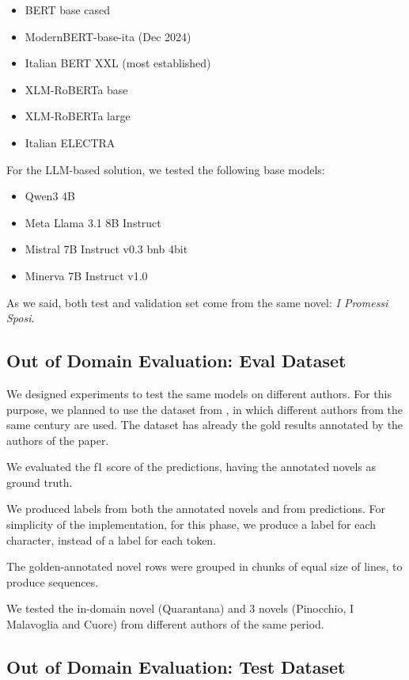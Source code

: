 \documentclass[11pt]{article}
\begin{document}
 \begin{itemize}
 	\item BERT base cased
	\item ModernBERT-base-ita (Dec 2024)
	\item Italian BERT XXL (most established)
	\item XLM-RoBERTa base
	\item XLM-RoBERTa large
	\item Italian ELECTRA
\end{itemize}

For the LLM-based solution, we tested the following base models:

 \begin{itemize}
 	\item Qwen3 4B
	\item Meta Llama 3.1 8B Instruct
	\item Mistral 7B Instruct v0.3 bnb 4bit
	\item Minerva 7B Instruct v1.0
\end{itemize}

As we said, both test and validation set come from the same novel: \emph{I Promessi Sposi}. 

\subsection{Out of Domain Evaluation: Eval Dataset}

We designed experiments to test the same models on different authors.
For this purpose, we planned to use the dataset from \cite{redaelli-sprugnoli-2024-sentence}, in which different authors
from the same century are used.
The dataset has already the gold results annotated by the authors of the paper.

We evaluated the f1 score of the predictions, having the annotated
novels as ground truth.

We produced labels from both the annotated novels and 
from predictions. For simplicity of the implementation,
for this phase, we produce a label for each character, instead of a label for each token.

The golden-annotated novel rows were grouped in chunks of equal size of lines, to produce sequences.

We tested the in-domain novel (Quarantana) and 3 novels (Pinocchio, I Malavoglia and Cuore) from different authors of the same period.

\subsection{Out of Domain Evaluation: Test Dataset}
\end{document}
